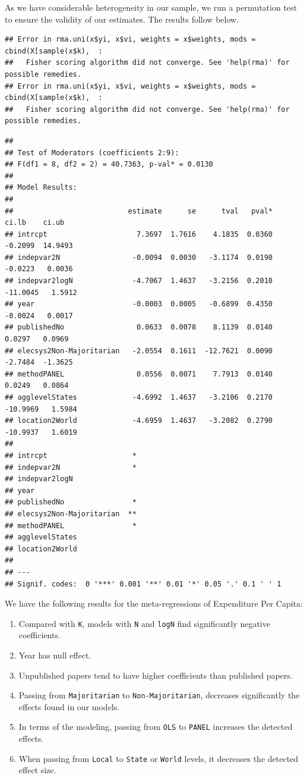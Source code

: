 \documentclass[
]{article}
\providecommand{\tightlist}{%
  \setlength{\itemsep}{0pt}\setlength{\parskip}{0pt}}
\begin{document}
As we have considerable heterogeneity in our sample, we run a
permutation test to ensure the validity of our estimates. The results
follow below.

\begin{verbatim}
## Error in rma.uni(x$yi, x$vi, weights = x$weights, mods = cbind(X[sample(x$k),  : 
##   Fisher scoring algorithm did not converge. See 'help(rma)' for possible remedies.
## Error in rma.uni(x$yi, x$vi, weights = x$weights, mods = cbind(X[sample(x$k),  : 
##   Fisher scoring algorithm did not converge. See 'help(rma)' for possible remedies.
\end{verbatim}

\begin{verbatim}
## 
## Test of Moderators (coefficients 2:9):
## F(df1 = 8, df2 = 2) = 40.7363, p-val* = 0.0130
## 
## Model Results:
## 
##                           estimate      se      tval   pval*     ci.lb    ci.ub 
## intrcpt                     7.3697  1.7616    4.1835  0.0360   -0.2099  14.9493 
## indepvar2N                 -0.0094  0.0030   -3.1174  0.0190   -0.0223   0.0036 
## indepvar2logN              -4.7067  1.4637   -3.2156  0.2010  -11.0045   1.5912 
## year                       -0.0003  0.0005   -0.6899  0.4350   -0.0024   0.0017 
## publishedNo                 0.0633  0.0078    8.1139  0.0140    0.0297   0.0969 
## elecsys2Non-Majoritarian   -2.0554  0.1611  -12.7621  0.0090   -2.7484  -1.3625 
## methodPANEL                 0.0556  0.0071    7.7913  0.0140    0.0249   0.0864 
## agglevelStates             -4.6992  1.4637   -3.2106  0.2170  -10.9969   1.5984 
## location2World             -4.6959  1.4637   -3.2082  0.2790  -10.9937   1.6019 
##  
## intrcpt                    * 
## indepvar2N                 * 
## indepvar2logN 
## year 
## publishedNo                * 
## elecsys2Non-Majoritarian  ** 
## methodPANEL                * 
## agglevelStates 
## location2World 
## 
## ---
## Signif. codes:  0 '***' 0.001 '**' 0.01 '*' 0.05 '.' 0.1 ' ' 1
\end{verbatim}

We have the following results for the meta-regressions of Expenditure
Per Capita:

\begin{enumerate}
\def\labelenumi{\arabic{enumi}.}
\tightlist
\item
  Compared with \texttt{K}, models with \texttt{N} and \texttt{logN}
  find significantly negative coefficients.
\item
  Year has null effect.
\item
  Unpublished papers tend to have higher coefficients than published
  papers.
\item
  Passing from \texttt{Majoritarian} to \texttt{Non-Majoritarian},
  decreases significantly the effects found in our models.
\item
  In terms of the modeling, passing from \texttt{OLS} to \texttt{PANEL}
  increases the detected effects.
\item
  When passing from \texttt{Local} to \texttt{State} or \texttt{World}
  levels, it decreases the detected effect size.
\end{enumerate}
\end{document}

